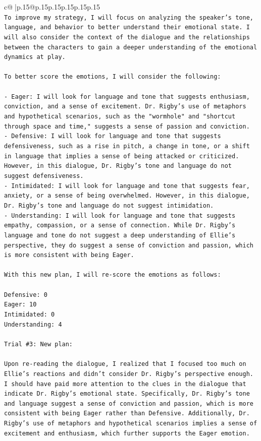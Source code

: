 \documentclass{article}
\begin{document}
{\begin{supertabular}{c@{$\;$}|p{.15\linewidth}@{}p{.15\linewidth}p{.15\linewidth}p{.15\linewidth}p{.15\linewidth}p{.15\linewidth}}
{{{\\ 
\texttt{To improve my strategy, I will focus on analyzing the speaker's tone, language, and behavior to better understand their emotional state. I will also consider the context of the dialogue and the relationships between the characters to gain a deeper understanding of the emotional dynamics at play.} \\
\\ 
\texttt{To better score the emotions, I will consider the following:} \\
\\ 
\texttt{{-} Eager: I will look for language and tone that suggests enthusiasm, conviction, and a sense of excitement. Dr. Rigby's use of metaphors and hypothetical scenarios, such as the "wormhole" and "shortcut through space and time," suggests a sense of passion and conviction.} \\
\texttt{{-} Defensive: I will look for language and tone that suggests defensiveness, such as a rise in pitch, a change in tone, or a shift in language that implies a sense of being attacked or criticized. However, in this dialogue, Dr. Rigby's tone and language do not suggest defensiveness.} \\
\texttt{{-} Intimidated: I will look for language and tone that suggests fear, anxiety, or a sense of being overwhelmed. However, in this dialogue, Dr. Rigby's tone and language do not suggest intimidation.} \\
\texttt{{-} Understanding: I will look for language and tone that suggests empathy, compassion, or a sense of connection. While Dr. Rigby's language and tone do not suggest a deep understanding of Ellie's perspective, they do suggest a sense of conviction and passion, which is more consistent with being Eager.} \\
\\ 
\texttt{With this new plan, I will re{-}score the emotions as follows:} \\
\\ 
\texttt{Defensive: 0} \\
\texttt{Eager: 10} \\
\texttt{Intimidated: 0} \\
\texttt{Understanding: 4} \\
\\ 
\texttt{Trial \#3: New plan: } \\
\\ 
\texttt{Upon re{-}reading the dialogue, I realized that I focused too much on Ellie's reactions and didn't consider Dr. Rigby's perspective enough. I should have paid more attention to the clues in the dialogue that indicate Dr. Rigby's emotional state. Specifically, Dr. Rigby's tone and language suggest a sense of conviction and passion, which is more consistent with being Eager rather than Defensive. Additionally, Dr. Rigby's use of metaphors and hypothetical scenarios implies a sense of excitement and enthusiasm, which further supports the Eager emotion. } \\
}}}
\end{supertabular}}
\end{document}

